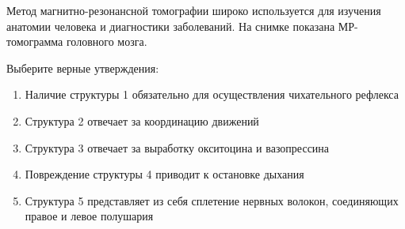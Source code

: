 
Метод
магнитно-резонансной томографии широко используется для изучения анатомии
человека и диагностики заболеваний. На снимке показана МР-томограмма головного
мозга.


Выберите
верные утверждения:

\begin{enumerate}
    \item Наличие структуры 1 обязательно для осуществления чихательного рефлекса
    \item Структура 2 отвечает за координацию движений
    \item Структура 3 отвечает за выработку окситоцина и вазопрессина
    \item Повреждение структуры 4 приводит к остановке дыхания
    \item Структура 5 представляет из себя сплетение нервных волокон, соединяющих правое и левое полушария 
\end{enumerate}
 


